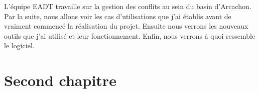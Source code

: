 \documentclass[12pt,a4paper,titlepage,twoside]{report}
\begin{document}
L'équipe EADT travaille sur la gestion des conflits au sein du basin d'Arcachon. Par la suite, nous allons voir les cas d'utilisations que j'ai établis avant de vraiment commencé la réalisation du projet. Ensuite nous verrons les nouveaux outils que j'ai utilisé et leur fonctionnement. Enfin, nous verrons à quoi ressemble le logiciel. 


\cleardoublepage
\chapter{Second chapitre}
% 
\end{document}

